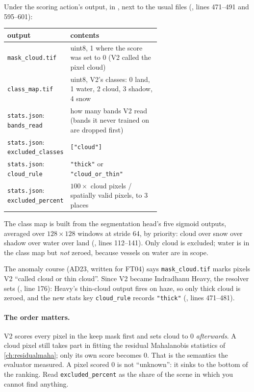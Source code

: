 Under the scoring action's output, in , next to the usual files
(, lines 471--491 and 595--601):
\begin{center}\small
\begin{tabular}{@{}lp{0.62\linewidth}@{}}
\toprule
output & contents\\
\midrule
\texttt{mask\_cloud.tif} & uint8, 1 where the score was set to 0 (V2 called the pixel cloud)\\
\texttt{class\_map.tif} & uint8, V2's classes: 0 land, 1 water, 2 cloud, 3 shadow, 4 snow\\
\texttt{stats.json}: \texttt{bands\_read} & how many bands V2 read (bands it never trained on are dropped first)\\
\texttt{stats.json}: \texttt{excluded\_classes} & \texttt{["cloud"]}\\
\texttt{stats.json}: \texttt{cloud\_rule} & \texttt{"thick"} or \texttt{"cloud\_or\_thin"}\\
\texttt{stats.json}: \texttt{excluded\_percent} & $100\times$ cloud pixels / spatially valid pixels, to 3 places\\
\bottomrule
\end{tabular}
\end{center}
The class map is built from the segmentation head's five sigmoid outputs, averaged over $128\times128$ windows
at stride 64, by priority: cloud over snow over shadow over water over land
(, lines 112--141). Only cloud is
excluded; water is in the class map but \emph{not} zeroed, because vessels on water are in scope.

\begin{sourcenote}
The anomaly course (AD23, written for FT04) says \texttt{mask\_cloud.tif} marks pixels V2 ``called cloud or
thin cloud''. Since V2 became Indradhanu Heavy, the resolver sets 
(, line 176): Heavy's thin-cloud output fires on haze, so
only thick cloud is zeroed, and the new stats key \texttt{cloud\_rule} records \texttt{"thick"}
(, lines 471--481).
\end{sourcenote}

\paragraph{The order matters.} V2 scores every pixel in the keep mask first and sets cloud to 0
\emph{afterwards}. A cloud pixel still takes part in fitting the residual Mahalanobis statistics of
\cref{ch:residualmaha}; only its own score becomes 0. That is the semantics the evaluator measured. A pixel
scored 0 is not ``unknown'': it sinks to the bottom of the ranking. Read \texttt{excluded\_percent} as the share
of the scene in which you cannot find anything.

